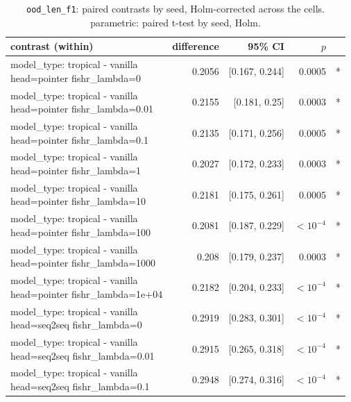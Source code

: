 \documentclass[10pt]{article}
\makeatletter
\newcommand{\stackcell}[1]{\begin{tabular}[t]{@{}l@{}}#1\end{tabular}}
\makeatother
\begin{document}
{\small
\begin{longtable}{lrrrl}
\caption{\texttt{ood\_len\_f1}: paired contrasts by seed, Holm-corrected across the cells. parametric: paired t-test by seed, Holm.}\label{tab:paired-ood_len_f1}\\
\toprule
contrast (within) & difference & 95\% CI & $p$ & \\
\midrule
\endhead
\stackcell{model\_type: tropical - vanilla\\\footnotesize head=pointer fishr\_lambda=0 } & 0.2056 & [0.167, 0.244] & 0.0005 & *\\
\stackcell{model\_type: tropical - vanilla\\\footnotesize head=pointer fishr\_lambda=0.01 } & 0.2155 & [0.181, 0.25] & 0.0003 & *\\
\stackcell{model\_type: tropical - vanilla\\\footnotesize head=pointer fishr\_lambda=0.1 } & 0.2135 & [0.171, 0.256] & 0.0005 & *\\
\stackcell{model\_type: tropical - vanilla\\\footnotesize head=pointer fishr\_lambda=1 } & 0.2027 & [0.172, 0.233] & 0.0003 & *\\
\stackcell{model\_type: tropical - vanilla\\\footnotesize head=pointer fishr\_lambda=10 } & 0.2181 & [0.175, 0.261] & 0.0005 & *\\
\stackcell{model\_type: tropical - vanilla\\\footnotesize head=pointer fishr\_lambda=100 } & 0.2081 & [0.187, 0.229] & $<10^{-4}$ & *\\
\stackcell{model\_type: tropical - vanilla\\\footnotesize head=pointer fishr\_lambda=1000 } & 0.208 & [0.179, 0.237] & 0.0003 & *\\
\stackcell{model\_type: tropical - vanilla\\\footnotesize head=pointer fishr\_lambda=1e+04 } & 0.2182 & [0.204, 0.233] & $<10^{-4}$ & *\\
\stackcell{model\_type: tropical - vanilla\\\footnotesize head=seq2seq fishr\_lambda=0 } & 0.2919 & [0.283, 0.301] & $<10^{-4}$ & *\\
\stackcell{model\_type: tropical - vanilla\\\footnotesize head=seq2seq fishr\_lambda=0.01 } & 0.2915 & [0.265, 0.318] & $<10^{-4}$ & *\\
\stackcell{model\_type: tropical - vanilla\\\footnotesize head=seq2seq fishr\_lambda=0.1 } & 0.2948 & [0.274, 0.316] & $<10^{-4}$ & *\\

\end{longtable}}
\end{document}
